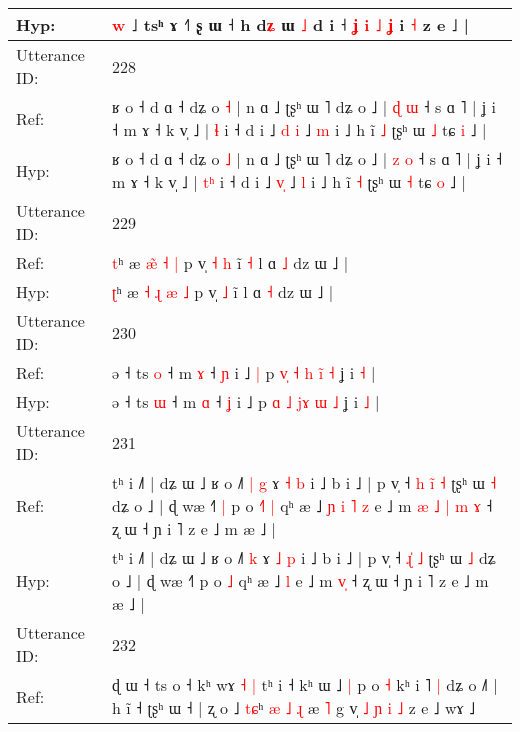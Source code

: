 \documentclass[10pt]{article}
\DeclareRobustCommand{\hl}[1]{{\textcolor{red}{#1}}}
\begin{document}
\begin{longtable}{ll}
 \\
Hyp: & \hl{}\hl{w} ˩ tsʰ ɤ ˧˥\hl{}\hl{} ʂ ɯ ˧ h\hl{}\hl{}\hl{}\hl{}\hl{}\hl{}\hl{} d\hl{ʑ} ɯ \hl{˩} d i ˧ \hl{}\hl{ʝ} \hl{i} \hl{˩} \hl{ʝ} i \hl{˧} z e ˩ |
 \\
\midrule
Utterance ID: & 228 \\
Ref: & ʁ o ˧ d ɑ ˧ dʑ o \hl{˧} | n ɑ ˩ ʈʂʰ ɯ ˥ dʑ o ˩ | \hl{ɖ} \hl{ɯ} ˧ s ɑ ˥ | ʝ i ˧ m ɤ ˧ k v̩ ˩ | \hl{}\hl{ɬ} i ˧ d i ˩ \hl{d}\hl{ }\hl{i} ˩ \hl{m} i ˩ h ĩ \hl{˩} ʈʂʰ ɯ \hl{˩} tɕ \hl{i} ˩ |
 \\
Hyp: & ʁ o ˧ d ɑ ˧ dʑ o \hl{˩} | n ɑ ˩ ʈʂʰ ɯ ˥ dʑ o ˩ | \hl{z} \hl{o} ˧ s ɑ ˥ | ʝ i ˧ m ɤ ˧ k v̩ ˩ | \hl{t}\hl{ʰ} i ˧ d i ˩ \hl{}\hl{v}\hl{̩} ˩ \hl{l} i ˩ h ĩ \hl{˧} ʈʂʰ ɯ \hl{˧} tɕ \hl{o} ˩ |
 \\
\midrule
Utterance ID: & 229 \\
Ref: & \hl{t}ʰ æ \hl{}\hl{æ}\hl{̃} \hl{˧} \hl{|} p v̩\hl{ }\hl{˧} \hl{h} ĩ\hl{ }\hl{˧} l ɑ \hl{˩} dz ɯ ˩ |
 \\
Hyp: & \hl{ʈ}ʰ æ \hl{˧}\hl{ }\hl{ɻ} \hl{æ} \hl{˩} p v̩\hl{}\hl{} \hl{˩} ĩ\hl{}\hl{} l ɑ \hl{˧} dz ɯ ˩ |
 \\
\midrule
Utterance ID: & 230 \\
Ref: & ə ˧ ts \hl{o} ˧ m \hl{ɤ} ˧ \hl{ɲ} i ˩\hl{ }\hl{|} p \hl{v}\hl{̩} \hl{˧} \hl{h}\hl{ }\hl{i}\hl{̃} \hl{˧} ʝ i \hl{˧} |
 \\
Hyp: & ə ˧ ts \hl{ɯ} ˧ m \hl{ɑ} ˧ \hl{ʝ} i ˩\hl{}\hl{} p \hl{}\hl{ɑ} \hl{˩} \hl{j}\hl{ɤ}\hl{ }\hl{ɯ} \hl{˩} ʝ i \hl{˩} |
 \\
\midrule
Utterance ID: & 231 \\
Ref: & tʰ i ˩˥ | dʑ ɯ ˩ ʁ o ˩˥\hl{ }\hl{|} \hl{g} ɤ \hl{˧} \hl{b} i ˩ b i ˩ | p v̩ ˧\hl{ }\hl{h} \hl{i}\hl{̃} \hl{˧} ʈʂʰ ɯ \hl{˧} dʑ o ˩ | ɖ wæ ˧˥\hl{ }\hl{|} p o\hl{ }\hl{˧}\hl{˥} \hl{|} qʰ æ ˩\hl{ }\hl{ɲ}\hl{ }\hl{i}\hl{ }\hl{˥} \hl{z} e ˩ m\hl{ }\hl{æ}\hl{ }\hl{˩}\hl{ }\hl{|} \hl{m}\hl{ }\hl{ɤ} ˧ ʐ ɯ ˧ ɲ i ˥ z e ˩ m æ ˩ |
 \\
Hyp: & tʰ i ˩˥ | dʑ ɯ ˩ ʁ o ˩˥\hl{}\hl{} \hl{k} ɤ \hl{˩} \hl{p} i ˩ b i ˩ | p v̩ ˧\hl{}\hl{} \hl{ɻ}\hl{̍} \hl{˩} ʈʂʰ ɯ \hl{˩} dʑ o ˩ | ɖ wæ ˧˥\hl{}\hl{} p o\hl{}\hl{}\hl{} \hl{˩} qʰ æ ˩\hl{}\hl{}\hl{}\hl{}\hl{}\hl{} \hl{l} e ˩ m\hl{}\hl{}\hl{}\hl{}\hl{}\hl{} \hl{}\hl{v}\hl{̩} ˧ ʐ ɯ ˧ ɲ i ˥ z e ˩ m æ ˩ |
 \\
\midrule
Utterance ID: & 232 \\
Ref: & ɖ ɯ ˧ ts o ˧ kʰ wɤ\hl{ }\hl{˧} \hl{|} tʰ i ˧ kʰ ɯ ˩\hl{ }\hl{|} p o \hl{˧} kʰ i ˥\hl{ }\hl{|} dʑ o ˩\hl{˥} | h ĩ ˧ ʈʂʰ ɯ ˧ | ʐ o ˩ \hl{t}\hl{ɕ}ʰ\hl{ }\hl{æ}\hl{ }\hl{˩}\hl{ }\hl{ɻ} æ \hl{˥} g v̩\hl{ }\hl{˩}\hl{ }\hl{ɲ} \hl{i} \hl{˩} z e ˩ wɤ ˩

\end{longtable}
\end{document}
